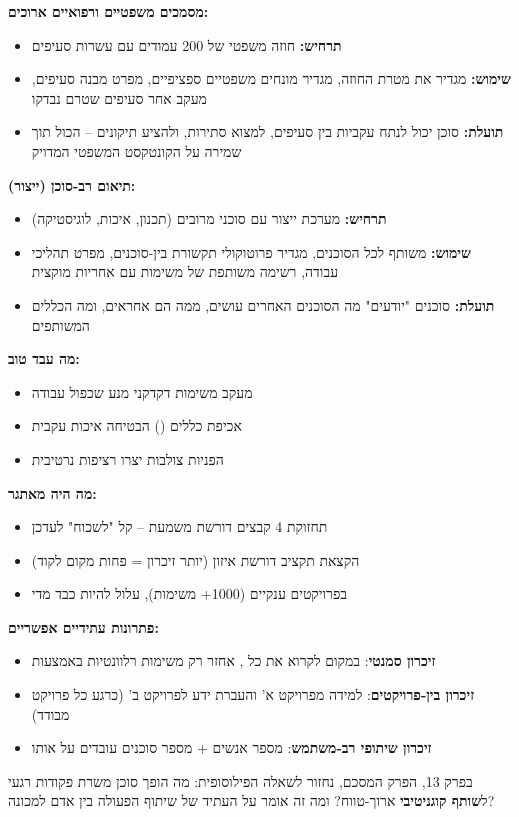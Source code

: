 \textbf{מסמכים משפטיים ורפואיים ארוכים:}
\begin{itemize}
  \item \textbf{תרחיש:} חוזה משפטי של \num{200} עמודים עם עשרות סעיפים
  \item \textbf{שימוש:}  מגדיר את מטרת החוזה,  מגדיר מונחים משפטיים ספציפיים,  מפרט מבנה סעיפים,  מעקב אחר סעיפים שטרם נבדקו
  \item \textbf{תועלת:} סוכן יכול לנתח עקביות בין סעיפים, למצוא סתירות, ולהציע תיקונים – הכול תוך שמירה על הקונטקסט המשפטי המדויק
\end{itemize}

\textbf{תיאום רב-סוכן (ייצור):}
\begin{itemize}
  \item \textbf{תרחיש:} מערכת ייצור עם סוכני  מרובים (תכנון, איכות, לוגיסטיקה)
  \item \textbf{שימוש:}  משותף לכל הסוכנים,  מגדיר פרוטוקולי תקשורת בין-סוכנים,  מפרט תהליכי עבודה,  רשימה משותפת של משימות עם אחריות מוקצית
  \item \textbf{תועלת:} סוכנים "יודעים" מה הסוכנים האחרים עושים, ממה הם אחראים, ומה הכללים המשותפים
\end{itemize}


\textbf{מה עבד טוב:}
\begin{itemize}
  \item מעקב משימות דקדקני מנע שכפול עבודה
  \item אכיפת כללים () הבטיחה איכות עקבית
  \item הפניות צולבות יצרו רציפות נרטיבית
\end{itemize}

\textbf{מה היה מאתגר:}
\begin{itemize}
  \item תחזוקת \num{4} קבצים דורשת משמעת – קל "לשכוח" לעדכן
  \item הקצאת תקציב  דורשת איזון (יותר זיכרון = פחות מקום לקוד)
  \item בפרויקטים ענקיים (\num{1000}+ משימות),  עלול להיות כבד מדי
\end{itemize}

\textbf{פתרונות עתידיים אפשריים:}
\begin{itemize}
  \item \textbf{זיכרון סמנטי}: במקום לקרוא את כל , אחזר רק משימות רלוונטיות באמצעות 
  \item \textbf{זיכרון בין-פרויקטים}: למידה מפרויקט א' והעברת ידע לפרויקט ב' (כרגע כל פרויקט מבודד)
  \item \textbf{זיכרון שיתופי רב-משתמש}: מספר אנשים + מספר סוכנים עובדים על אותו 
\end{itemize}

בפרק \num{13}, הפרק המסכם, נחזור לשאלה הפילוסופית: מה הופך סוכן  משרת פקודות רגעי ל\textbf{שותף קוגניטיבי} ארוך-טווח? ומה זה אומר על העתיד של שיתוף הפעולה בין אדם למכונה?
